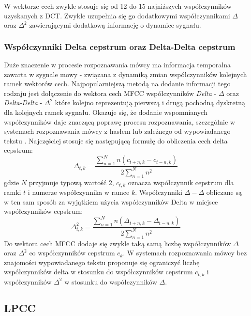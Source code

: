 W wektorze cech zwykle stosuje się od 12 do 15 najniższych współczynników uzyskanych z DCT. Zwykle uzupełnia się go dodatkowymi współczynnikami $\Delta$ oraz $\Delta^2$ zawierającymi dodatkową informację o dynamice sygnału. 

\subsubsection{Współczynniki Delta cepstrum oraz Delta-Delta cepstrum}

  Duże znaczenie w procesie rozpoznawania mówcy ma informacja temporalna zawarta w sygnale mowy - związana z dynamiką zmian współczynników kolejnych ramek wektorów cech. Najpopularniejszą metodą na dodanie informacji tego rodzaju jest dołączenie do wektora cech MFCC współczynników \textit{Delta} - $\Delta$ oraz \textit{Delta-Delta} - $\Delta^2$ które kolejno reprezentują pierwszą i drugą pochodną dyskretną dla kolejnych ramek sygnału. Okazuje się, że dodanie wspomnianych współczynników daje znaczącą poprawę procesu rozpoznawania, szczególnie w systemach rozpoznawania mówcy z hasłem lub zależnego od wypowiadanego tekstu \cite{delta}. Najczęściej stosuje się następującą formułę do obliczenia cech delta cepstrum:
\begin{equation}
  \Delta_{t, k} = \frac{\sum^N_{n=1} n(c_{t+n,k} - c_{t-n,k})}{2\sum^N_{n=1} n^2} 
\end{equation}
gdzie $N$ przyjmuje typową wartość 2, $c_{t,k}$ oznacza współczynnik cepstrum dla ramki $t$ i numerze współczynnika w ramce $k$. Współczynniki $\Delta-\Delta$ obliczane są w ten sam sposób za wyjątkiem użycia współczynników Delta w miejsce współczynników cepstrum:
\begin{equation}
  \Delta^2_{t, k} = \frac{\sum^N_{n=1} n(\Delta_{t+n,k} - \Delta_{t-n,k})}{2\sum^N_{n=1} n^2} 
\end{equation}
Do wektora cech MFCC dodaje się zwykle taką samą liczbę współczynników $\Delta$ oraz $\Delta^2$ co współczynników cepstrum $c_{k}$. W systemach rozpoznawania mówcy bez znajomości wypowiadanego tekstu proponuje się ograniczyć liczbę współczynników delta w stosunku do współczynników cepstrum $c_{t,k}$ i współczynników $\Delta^2$ w stosunku do współczynników $\Delta$\cite{fosr}.

\subsection{LPCC}
\label{LPCC}

